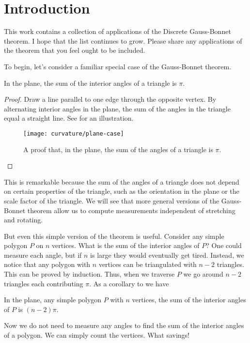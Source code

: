 \section{Introduction}
\label{sec:intro}

This work contains a collection of applications of the 
Discrete Gauss-Bonnet theorem.
I hope that the list continues to grow.
Please share any applications of the theorem that you feel
ought to  be included.


To begin, let's consider a familiar special case of the Gauss-Bonnet
theorem.
\begin{theorem}\label{thm:triangle}
In the plane, the sum of the interior angles of a triangle is $\pi$.
\end{theorem}
\begin{proof}
Draw a line parallel to one edge through the opposite vertex.
By alternating interior angles in the plane, the sum of the angles
in the triangle equal  a straight line.
See  for an illustration. 



\begin{figure}[htb]
\centering
\texttt{[image: curvature/plane-case]}
\caption{A proof that, in the plane, the sum of the angles of a triangle is $\pi$.}
\label{fig:angles}
\end{figure}

\end{proof}

This is remarkable because the sum of the angles of a triangle does not
depend on certain properties of the  triangle, such as the orientation in the plane or
the scale factor of the triangle.
We will see that more general versions of the Gauss-Bonnet theorem allow us 
to compute measurements independent of stretching and rotating.

But even this simple version of the theorem is useful.
Consider any simple polygon $P$ on $n$ vertices. 
What is the sum of the interior angles of $P$?
One could measure each angle, but if $n$ is large they would eventually
get tired.
Instead, we notice that any polygon with $n$ vertices can be
triangulated with $n-2$ triangles. This can be proved by induction.
Thus, when we traverse $P$ we go around $n-2$ triangles each contributing
$\pi$.
As a corollary to  we have
\begin{corollary}\label{cor:angles}
In the plane, any simple polygon $P$ with $n$ vertices,
the sum of the interior angles of $P$ is $(n-2)\pi$.

\end{corollary}

Now we do not need to measure any angles to find
the sum of  the interior angles of a polygon. We can simply
count the vertices. What savings!




